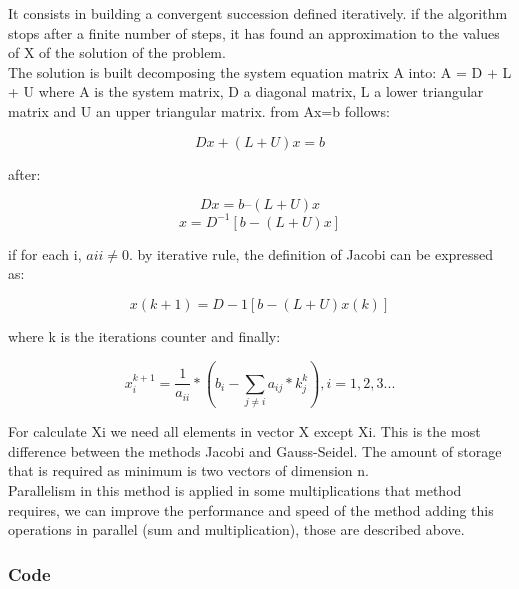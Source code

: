 \documentclass{article}
\begin{document}
It consists in building a convergent succession defined iteratively. if the algorithm stops after a finite number of steps, it has found an approximation to the values of X of the solution of the problem.\\

The solution is built decomposing the system equation matrix A into:
A = D + L + U where A is the system matrix, D a diagonal matrix, L a lower
triangular matrix and U an upper triangular matrix.
from Ax=b follows:
\begin{center}
  \[Dx + (L + U)x = b\]
\end{center}
after:
\begin{center}
  \[Dx = b – (L + U)x\]
  \[x = D^{-1}[b-(L+U)x]\]
\end{center}
if for each i, $aii \neq  0.$ by iterative rule, the definition of Jacobi can be
expressed as:
\begin{center}
  \[x(k+1) = D-1 [b-(L + U)x(k)]\]
\end{center}
where k is the iterations counter and finally:
\begin{center}
  \[x_{i}^{k+1} = \frac{1}{a_{ii}}*(b_{i}-\sum_{j\neq i}a_{ij}*k_{j}^{k}) , i=1,2,3...\]
\end{center}
For calculate Xi we need all elements in vector X except Xi. This is the most
difference between the methods Jacobi and Gauss-Seidel. The amount of storage
that is required as minimum is two vectors of dimension n.\\

Parallelism in this method is applied in some multiplications that method
requires, we can improve the performance and speed of the method adding this
operations in parallel (sum and multiplication), those are described above.

\subsubsection{Code}
\end{document}
